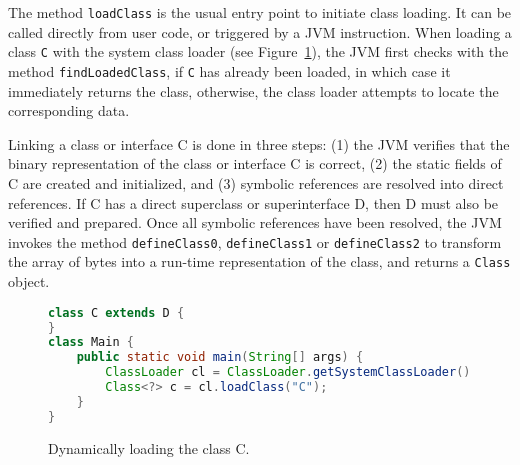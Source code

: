 The method \verb|loadClass| is the usual entry point to initiate class loading. It can be called directly from user code, or triggered by a JVM instruction.
When loading a class \verb|C| with the system class loader (see Figure~\ref{fig:class_C}), the JVM first checks with the method \verb|findLoadedClass|, if \verb|C| has already been loaded, in which case it immediately returns the class, otherwise, the class loader attempts to locate the corresponding data. 

Linking a class or interface C is done in three steps: (1) the JVM verifies that the binary representation of the class or interface C is correct, (2) the static fields of C are created and initialized, and (3) symbolic references are resolved into direct references. If C has a direct superclass or superinterface D, then D must also be verified and prepared. 
Once all symbolic references have been resolved, the JVM invokes the method \verb|defineClass0|, \verb|defineClass1| or \verb|defineClass2| to transform the array of bytes into a run-time representation of the class, and returns a \verb|Class| object.

\begin{figure}[ht]
    \centering
\begin{lstlisting}[language=Java]
class C extends D {
}
class Main {
    public static void main(String[] args) {
        ClassLoader cl = ClassLoader.getSystemClassLoader();
        Class<?> c = cl.loadClass("C");
    }
}
\end{lstlisting}
    \caption{Dynamically loading the class C.}
    \label{fig:class_C}
\end{figure}



% 

